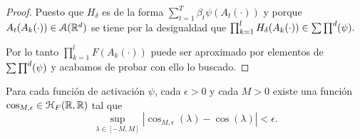 \begin{proof}
    Puesto que $H_\delta$ es de la forma  $\sum_{t=1}^T \beta_t \psi(A_t(\cdot))$ 
    y porque $A_t(A_k(\cdot)) \in \mathcal{A}(\mathbb{R}^d)$ se tiene por la desigualdad  que 
    $\prod ^l_{k=1} H_\delta(A_k(\cdot)) \in \sum \prod^d (\psi).$

    Por lo tanto $\prod ^l_{k=1} F(A_k(\cdot))$ puede ser 
    aproximado por elementos de $\sum \prod^d (\psi)$ y acabamos de probar con ello lo buscado. 
\end{proof} 

\begin{lema}\label{lema:A_3_función_activación_continua_con_arbitaria}
    Para cada función de activación $\psi$, cada $\epsilon >0$
    y cada $M>0$ existe una función 
    $\cos_{M,\epsilon} \in \mathcal{H}_F{(\mathbb{R}, \mathbb{R})}$ tal que 
    \begin{equation}
        \sup_{ \lambda \in [-M, M]}
        |\cos_{M,\epsilon}(\lambda) - \cos(\lambda)|
        < 
        \epsilon. 
    \end{equation}
\end{lema}
